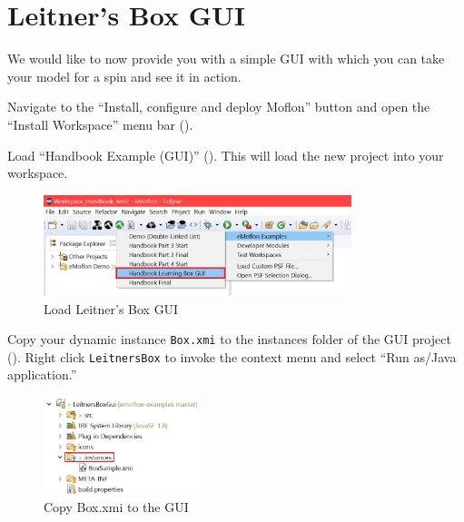 \newpage
\section{Leitner's Box GUI}
\genHeader

We would like to now provide you with a simple GUI with which you can take your model for a spin and see it in action.

\begin{stepbystep}

\item Navigate to the ``Install, configure and deploy Moflon'' button and open the ``Install Workspace'' menu bar ().

\item Load ``Handbook Example (GUI)'' (). This will load the new project into your workspace. 

\begin{figure}[htbp]
    \centering
    \includegraphics[width=0.8\textwidth]{../../org.moflon.doc.handbook.02_leitnersLearningBox/6_LLBGui/guiImages/eclipse_loadGUI}
    \caption{Load Leitner's Box GUI}
    \label{eclipse:GUI_load}
\end{figure}

\item Copy your dynamic instance \texttt{Box.xmi} to the instances folder of the GUI project (). Right click \texttt{LeitnersBox} to invoke the context menu and select ``Run as/Java application.''

\begin{figure}[htbp]
    \centering
    \includegraphics[width=0.4\textwidth]{../../org.moflon.doc.handbook.02_leitnersLearningBox/6_LLBGui/guiImages/eclipse_copyBox}
    \caption{Copy Box.xmi to the GUI}
    \label{eclipse:Copy_instance}
\end{figure}


\end{stepbystep}
